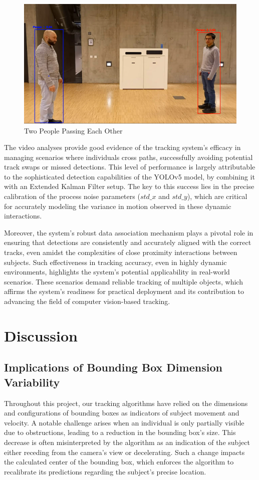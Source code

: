 \documentclass{article}
\begin{document}
\begin{figure}[H]
\centering
\includegraphics[width=0.5\linewidth]{two people passing.png}
\caption{Two People Passing Each Other}
\label{fig:two human}
\end{figure}

The video analyses provide good evidence of the tracking system's efficacy in managing scenarios where individuals cross paths, successfully avoiding potential track swaps or missed detections. This level of performance is largely attributable to the sophisticated detection capabilities of the YOLOv5 model, by combining it with an Extended Kalman Filter setup. The key to this success lies in the precise calibration of the process noise parameters (\(std\_x\) and \(std\_y\)), which are critical for accurately modeling the variance in motion observed in these dynamic interactions.

Moreover, the system's robust data association mechanism plays a pivotal role in ensuring that detections are consistently and accurately aligned with the correct tracks, even amidst the complexities of close proximity interactions between subjects. Such effectiveness in tracking accuracy, even in highly dynamic environments, highlights the system's potential applicability in real-world scenarios. These scenarios demand reliable tracking of multiple objects, which affirms the system's readiness for practical deployment and its contribution to advancing the field of computer vision-based tracking.

\section{Discussion}
\subsection{Implications of Bounding Box Dimension Variability}
Throughout this project, our tracking algorithms have relied on the dimensions and configurations of bounding boxes as indicators of subject movement and velocity. A notable challenge arises when an individual is only partially visible due to obstructions, leading to a reduction in the bounding box's size. This decrease is often misinterpreted by the algorithm as an indication of the subject either receding from the camera's view or decelerating. Such a change impacts the calculated center of the bounding box, which enforces the algorithm to recalibrate its predictions regarding the subject's precise location.
\end{document}
